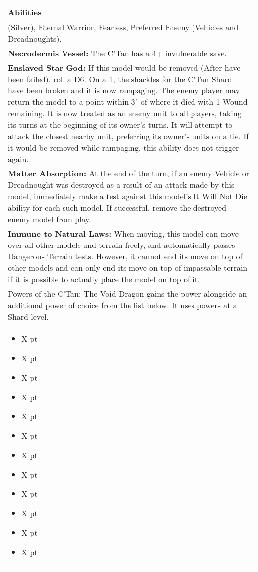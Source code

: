 \noindent
\begin{tabular}{||m{532pt}||}
	\hline
	Abilities \\
	\hline
	\quickref{Awakening Protocols} (Silver), Eternal Warrior, Fearless, Preferred Enemy (Vehicles and Dreadnoughts), \quickref{Reanimation Protocols} \\
	\textbf{Necrodermis Vessel:} The C'Tan has a 4+ invulnerable save. \\
	\textbf{Enslaved Star God:} If this model would be removed (After \quickref{Reanimation Protocols} have been failed), roll a D6. On a 1, the shackles for the C'Tan Shard have been broken and it is now rampaging. The enemy player may return the model to a point within 3" of where it died with 1 Wound remaining. It is now treated as an enemy unit to all players, taking its turns at the beginning of its owner's turns. It will attempt to attack the closest nearby unit, preferring its owner's units on a tie. If it would be removed while rampaging, this ability does not trigger again. \\
	\textbf{Matter Absorption:} At the end of the turn, if an enemy Vehicle or Dreadnought was destroyed as a result of an attack made by this model, immediately make a test against this model's It Will Not Die ability for each such model. If successful, remove the destroyed enemy model from play. \\
	\textbf{Immune to Natural Laws:} When moving, this model can move over all other models and terrain 	freely, and automatically passes Dangerous Terrain tests. However, it 	cannot end its move on top of other models and can only end its move on top of impassable terrain if it is possible to actually place the model on top of it. \\
	Powers of the C'Tan: The Void Dragon gains the \quickref{Voltaic Storm} power alongside an additional power of choice from the list below. It uses powers at a Shard level. \\
	\begin{itemize}
		\item \quickref{Antimatter Meteor} \hrulefill X pt
		\item \quickref{Cosmic Fire} \hrulefill X pt
		\item \quickref{Entropic Touch} \hrulefill X pt
		\item \quickref{Moulder of Worlds} \hrulefill X pt
		\item \quickref{Pyreshards} \hrulefill X pt
		\item \quickref{Sentient Singularity} \hrulefill X pt
		\item \quickref{Seismic Assault} \hrulefill X pt
		\item \quickref{Sky of Falling Stars} \hrulefill X pt
		\item \quickref{Swarm of Spirit Dust} \hrulefill X pt
		\item \quickref{Time's Arrow} \hrulefill X pt
		\item \quickref{Transdimensional Thunderbolt} \hrulefill X pt
		\item \quickref{Withering Worldscape} \hrulefill X pt
	\end{itemize} \\
	\hline
\end{tabular}
